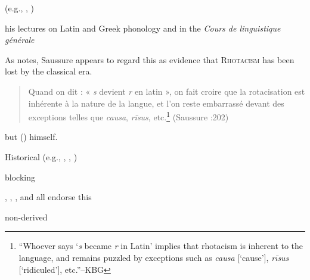 (e.g., \citealt[73]{Embick2010}, \citealt{Halle1998a})


\citet{Baldi1994}
\citet[41f.]{Safarewicz1932}

his lectures on Latin and Greek phonology \citep{Reichler-Beguelin1980} and in the \emph{Cours de linguistique générale} \citep{CLG}

As \citet[54]{Anderson1985} notes, Saussure appears to regard this as evidence that \textsc{Rhotacism} has been lost by the classical era.

\begin{quote}
Quand on dit : « \emph{s} devient \emph{r} en latin », on fait croire que
la rotacisation est inhérente à la nature de la langue, et l'on reste
embarrassé devant des exceptions telles que \emph{causa}, \emph{rīsus},
etc.\footnote{
    ``Whoever says `\emph{s} became \emph{r} in Latin' implies
that rhotacism is inherent to the language, and remains puzzled by
exceptions such as \emph{causa} [`cause'], \emph{rīsus} [`ridiculed'],
etc.''--KBG}
(Saussure \citeyear{CLG}:202)
\end{quote}

\citep{KiparskyInPress} but
\citeauthor{KiparskyInPress} (\citeyear{Kiparsky1968,Kiparsky1973a,Kiparsky1982a,Kiparsky1993}) himself.

Historical (e.g., \citealt[\S180]{Leumann1977}, \citealt[\S173]{Sihler1995}, \citealt[\S119]{Sommer1902})

blocking

\citet[42f.]{Cser2010}, \citet[144]{Gruber2006}, \citet[66]{Ito2003}, and \citet[88]{Roberts2012} all endorse this



non-derived

\citet[90]{Blumenfeld2003}
\citet[149]{Gruber2006}
\citet{Roberts2012}
\citet[260f.]{Touratier1971}


